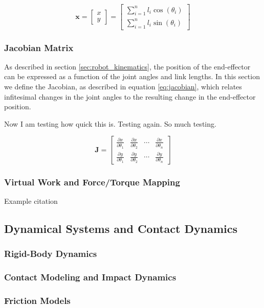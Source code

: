 \begin{equation}
    \label{eq:robot_kinematics}
    \mathbf{x} = \begin{bmatrix}
        x \\
        y
    \end{bmatrix} = \begin{bmatrix}
        \sum_{i=1}^{n} l_i \cos(\theta_i) \\
        \sum_{i=1}^{n} l_i \sin(\theta_i)
    \end{bmatrix}
\end{equation}


    \subsubsection{Jacobian Matrix}

As described in section \ref{sec:robot_kinematics}, the position of the end-effector can be expressed as a function of the joint angles and link lengths. In this section we define the Jacobian, as described in equation \ref{eq:jacobian}, which relates infitesimal changes in the joint angles to the resulting change in the end-effector position.

Now I am testing how quick this is. Testing again. So much testing. 

\begin{equation}
    \label{eq:jacobian}
    \mathbf{J} = \begin{bmatrix}
        \frac{\partial x}{\partial \theta_1} & \frac{\partial x}{\partial \theta_2} & \cdots & \frac{\partial x}{\partial \theta_n} \\
        \frac{\partial y}{\partial \theta_1} & \frac{\partial y}{\partial \theta_2} & \cdots & \frac{\partial y}{\partial \theta_n}
    \end{bmatrix}
\end{equation}


    \subsubsection{Virtual Work and Force/Torque Mapping}

    Example citation \cite{schulman_proximal_2017}

\subsection{Dynamical Systems and Contact Dynamics}
    \subsubsection{Rigid-Body Dynamics}
    \subsubsection{Contact Modeling and Impact Dynamics}
    \subsubsection{Friction Models}
